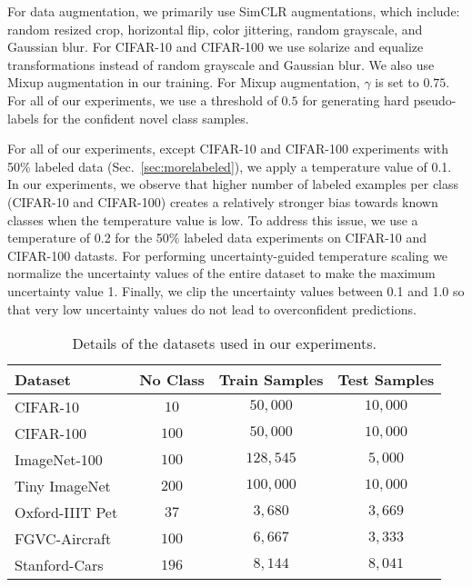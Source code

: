\documentclass[runningheads]{eccv2022submission}
\begin{document}
For data augmentation, we primarily use SimCLR\cite{chen2020simple} augmentations, which include: random resized crop, horizontal flip, color jittering, random grayscale, and Gaussian blur. For CIFAR-10 and CIFAR-100 we use solarize and equalize transformations instead of random grayscale and Gaussian blur. We also use Mixup augmentation in our training. For Mixup \cite{zhang2018mixup} augmentation, $\gamma$ is set to $0.75$. For all of our experiments, we use a threshold of $0.5$ for generating hard pseudo-labels for the confident novel class samples.     

For all of our experiments, except CIFAR-10 and CIFAR-100 experiments with 50\% labeled data (Sec.~\ref{sec:morelabeled}), we apply a temperature value of 0.1. In our experiments, we observe that higher number of labeled examples per class (CIFAR-10 and CIFAR-100) creates a relatively stronger bias towards known classes when the temperature value is low. To address this issue, we use a temperature of 0.2 for the 50\% labeled data experiments on CIFAR-10 and CIFAR-100 datasts. For performing uncertainty-guided temperature scaling we normalize the uncertainty values of the entire dataset to make the maximum uncertainty value 1. Finally, we clip the uncertainty values between 0.1 and 1.0 so that very low uncertainty values do not lead to overconfident predictions. 
\begin{table*}[h]
\caption{Details of the datasets used in our experiments.}
\label{tab:dataset}
\begin{center}\setlength{\tabcolsep}{4pt}
\small
\begin{tabular}{lccc}
\hline



\textbf{Dataset} & \textbf{No Class} & \textbf{Train Samples} & \textbf{Test Samples}
 \\




\hline
CIFAR-10~\cite{cifar10} & $10$ & $50,000$ & $10,000$ \\
CIFAR-100~\cite{cifar100} & $100$ & $50,000$ & $10,000$ \\
ImageNet-100~\cite{russakovsky2015imagenet} & $100$ & $128,545$ & $5,000$ \\
Tiny ImageNet~\cite{le2015tiny} & $200$ & $100,000$ & $10,000$\\
Oxford-IIIT Pet~\cite{parkhi12a} & $37$ & $3,680$ & $3,669$\\
FGVC-Aircraft~\cite{maji13fine-grained} & $100$ & $6,667$ & $3,333$ \\
Stanford-Cars~\cite{KrauseStarkDengFei-Fei_3DRR2013} & $196$ & $8,144$ & $8,041$\\ \hline 



\end{tabular}
\end{center}
\end{table*}
\end{document}
